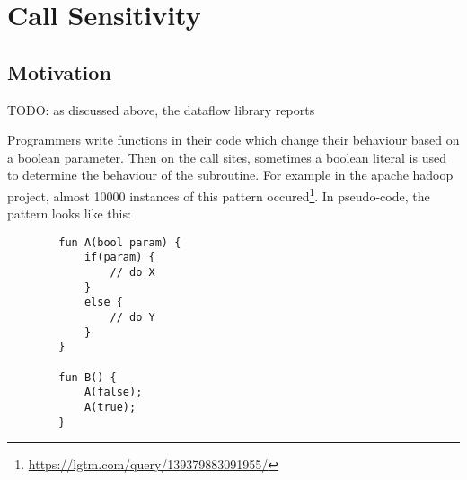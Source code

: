 









\newpage
\section{Call Sensitivity}
\subsection{Motivation}
TODO: as discussed above, the dataflow library reports 

Programmers write functions in their code which change their behaviour based on 
a boolean parameter.
Then on the call sites, sometimes a boolean literal is used to determine the behaviour
of the subroutine.
For example in the apache hadoop project, almost 10000 instances of this
pattern occured\footnote{\url{https://lgtm.com/query/139379883091955/}}.
In pseudo-code, the pattern looks like this:
\begin{verbatim}
        fun A(bool param) {
            if(param) {
                // do X
            }
            else {
                // do Y
            }
        }

        fun B() {
            A(false);
            A(true);
        }
\end{verbatim}


